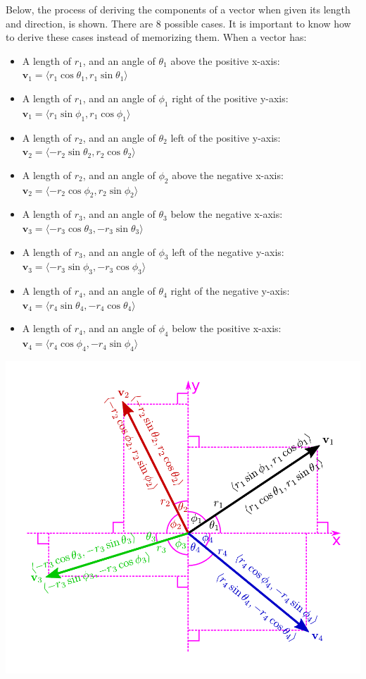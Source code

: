 \documentclass{article}
\begin{document}
Below, the process of deriving the components of a vector when given its length and direction, is shown. There are 8 possible cases. It is important to know how to derive these cases instead of memorizing them. When a vector has:
\begin{itemize}
\item A length of \(r_1\), and an angle of \(\theta_1\) above the positive x-axis: \(\mathbf{v}_1 = \langle r_1\cos\theta_1, r_1\sin\theta_1 \rangle\)
\item A length of \(r_1\), and an angle of \(\phi_1\) right of the positive y-axis: \(\mathbf{v}_1 = \langle r_1\sin\phi_1, r_1\cos\phi_1 \rangle\)
\item A length of \(r_2\), and an angle of \(\theta_2\) left of the positive y-axis: \(\mathbf{v}_2 = \langle -r_2\sin\theta_2, r_2\cos\theta_2 \rangle\)
\item A length of \(r_2\), and an angle of \(\phi_2\) above the negative x-axis: \(\mathbf{v}_2 = \langle -r_2\cos\phi_2, r_2\sin\phi_2 \rangle\)
\item A length of \(r_3\), and an angle of \(\theta_3\) below the negative x-axis: \(\mathbf{v}_3 = \langle -r_3\cos\theta_3, -r_3\sin\theta_3 \rangle\)
\item A length of \(r_3\), and an angle of \(\phi_3\) left of the negative y-axis: \(\mathbf{v}_3 = \langle -r_3\sin\phi_3, -r_3\cos\phi_3 \rangle\)
\item A length of \(r_4\), and an angle of \(\theta_4\) right of the negative y-axis: \(\mathbf{v}_4 = \langle r_4\sin\theta_4, -r_4\cos\theta_4 \rangle\)
\item A length of \(r_4\), and an angle of \(\phi_4\) below the positive x-axis: \(\mathbf{v}_4 = \langle r_4\cos\phi_4, -r_4\sin\phi_4 \rangle\)
\end{itemize}
\includegraphics[width = \textwidth]{polar_vector_to_cartesian_vector}
\end{document}
